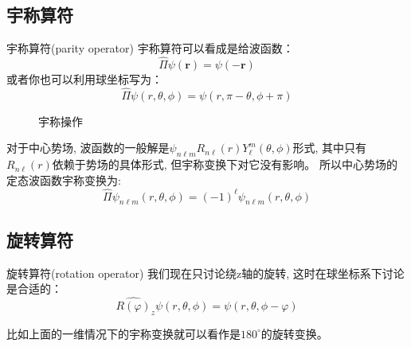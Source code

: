 \subsection*{宇称算符}
\begin{define}{宇称算符(parity operator)}
    宇称算符可以看成是给波函数：
    \begin{equation}
        \boxed{\hat \Pi\psi(\mathbf{r})=\psi(-\mathbf{r})}
    \end{equation}
    或者你也可以利用球坐标写为：
    \begin{equation}
        \hat \Pi\psi(r,\theta,\phi)=\psi(r,\pi-\theta,\phi+\pi)
    \end{equation}
\end{define}
\begin{figure}[htbp]
    \centering
    \caption{宇称操作}
\end{figure}
对于中心势场, 波函数的一般解是$\psi_{n\ell m}R_{n\ell}(r)Y_\ell^m(\theta,\phi)$形式, 其中只有$R_{n\ell}(r)$依赖于势场的具体形式, 但宇称变换下对它没有影响。
所以中心势场的定态波函数宇称变换为:$$\hat\Pi\psi_{n\ell m}(r,\theta,\phi)=(-1)^{\ell}\psi_{n\ell m}(r,\theta,\phi)$$

\subsection*{旋转算符}
\begin{define}{旋转算符(rotation operator)}
    我们现在只讨论绕z轴的旋转, 这时在球坐标系下讨论是合适的：
    \begin{equation}
        \label{eq:6.4}
        \boxed{\hat{R(\varphi)}_z\psi(r,\theta,\phi)=\psi(r,\theta,\phi-\varphi)}
    \end{equation}
\end{define}
比如上面的一维情况下的宇称变换就可以看作是$180^\circ$的旋转变换。

